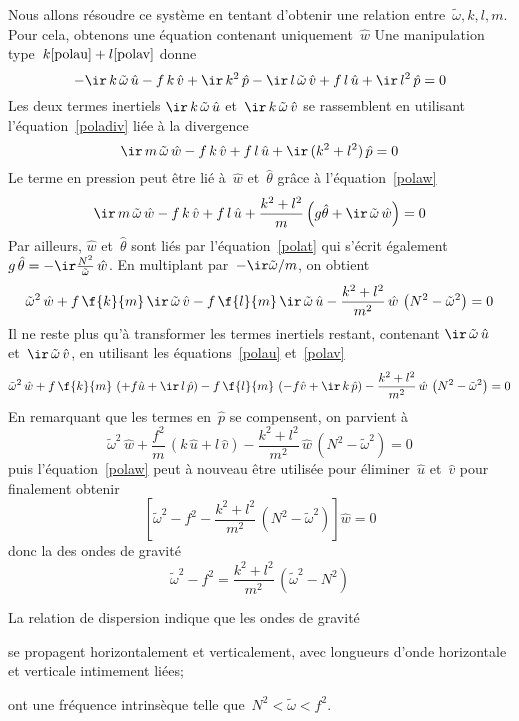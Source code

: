 \sk
Nous allons résoudre ce système 
en tentant d'obtenir une relation entre~$\tilde{\omega},k,l,m$.
Pour cela, obtenons une équation contenant uniquement~$\hat{w}$
Une manipulation type~$k \ref{polau} + l \ref{polav}$ donne
\[
- \ir \, k \, \tilde{\omega} \, \hat{u}
- f \, k \, \hat{v}
+ \ir \, k^2 \, \hat{p} 
- \ir \, l \, \tilde{\omega} \, \hat{v}
+ f \, l \, \hat{u}
+ \ir \, l^2 \, \hat{p} 
= 0
\]
\noindent Les deux termes inertiels $\ir \, k \, \tilde{\omega} \, \hat{u}$ et~$\ir \, k \, \tilde{\omega} \, \hat{v}$ 
se rassemblent en utilisant l'équation~\ref{poladiv} liée à la divergence
\[
\ir \, m \, \tilde{\omega} \, \hat{w}
- f \, k \, \hat{v}
+ f \, l \, \hat{u}
+ \ir \, (k^2 + l^2) \, \hat{p}
= 0
\]
\noindent Le terme en pression peut être lié à~$\hat{w}$ et~$\hat{\theta}$ grâce à l'équation~\ref{polaw}
\[
\ir \, m \, \tilde{\omega} \, \hat{w}
- f \, k \, \hat{v}
+ f \, l \, \hat{u}
+ \frac{k^2 + l^2}{m} \left( g \hat{\theta} + \ir \, \tilde{\omega} \, \hat{w} \right)
= 0
\]
\noindent Par ailleurs, $\hat{w}$ et~$\hat{\theta}$ sont liés par l'équation~\ref{polat} qui s'écrit également $g \, \hat{\theta} = - \ir \frac{N^2}{\tilde{\omega}} \, \hat{w}$. En multiplant par~$- \ir \tilde{\omega} / m$, on obtient
\[
\tilde{\omega}^2 \, \hat{w}
+ f \, \f{k}{m} \, \ir \, \tilde{\omega} \, \hat{v}
- f \, \f{l}{m} \, \ir \, \tilde{\omega} \, \hat{u}
- \frac{k^2 + l^2}{m^2} \, \hat{w} \, \left( N^2 - \tilde{\omega}^2 \right)
= 0
\]
\noindent Il ne reste plus qu'à transformer les termes inertiels restant, contenant $\ir \, \tilde{\omega} \, \hat{u}$ et~$\ir \, \tilde{\omega} \, \hat{v}$, en utilisant les équations~\ref{polau} et~\ref{polav}
\[
\tilde{\omega}^2 \, \hat{w}
+ f \, \f{k}{m} \, \left( + f \hat{u} + \ir \, l \, \hat{p} \right)
- f \, \f{l}{m} \, \left( - f \hat{v} + \ir \, k \, \hat{p} \right) 
- \frac{k^2 + l^2}{m^2} \, \hat{w} \, \left( N^2 - \tilde{\omega}^2 \right)
= 0
\]
\noindent En remarquant que les termes en~$\hat{p}$ se compensent, on parvient à
\[
\tilde{\omega}^2 \, \hat{w}
+ \frac{f^2}{m} \, \left( k \, \hat{u} + l \, \hat{v} \right)
- \frac{k^2 + l^2}{m^2} \, \hat{w} \, \left( N^2 - \tilde{\omega}^2 \right)
= 0
\]
\noindent puis l'équation~\ref{polaw} peut à nouveau être utilisée pour éliminer~$\hat{u}$ et~$\hat{v}$
pour finalement obtenir 
\[
\left[
\tilde{\omega}^2 - f^2
- \frac{k^2 + l^2}{m^2} \, \left( N^2 - \tilde{\omega}^2 \right)
\right] \hat{w}
= 0
\]
\noindent donc la  des ondes de gravité
\[ \boxed{
\tilde{\omega}^2 - f^2 = \frac{k^2 + l^2}{m^2} \, \left( \tilde{\omega}^2 - N^2 \right)
} \]

\sk
La relation de dispersion indique que les ondes de gravité
\begin{finger}
\item se propagent horizontalement et verticalement, avec longueurs d'onde horizontale et verticale intimement liées;
\item ont une fréquence intrinsèque telle que~$N^2 < \tilde{\omega} < f^2$.
\end{finger}
